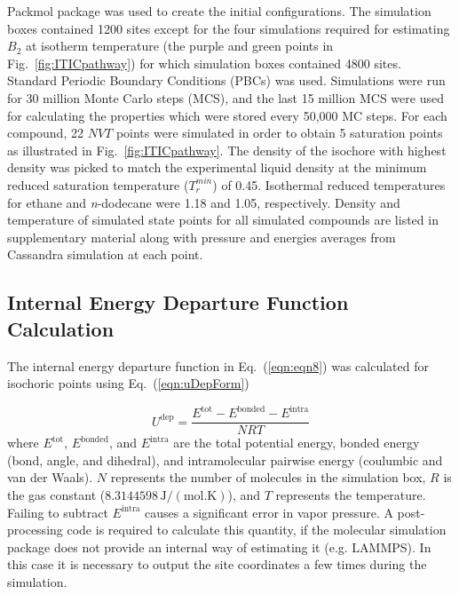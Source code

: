 \documentclass[5p,times]{elsarticle}
\begin{document}
Packmol \cite{martinez2009packmol} package was used to create the initial configurations. The simulation boxes contained 1200 sites except for the four simulations required for estimating $B_2$ at isotherm temperature (the purple and green points in Fig.~\ref{fig:ITICpathway}) for which simulation boxes contained 4800 sites. Standard Periodic Boundary Conditions (PBCs) was used. Simulations were run for 30 million Monte Carlo steps (MCS), and the last 15 million MCS were used for calculating the properties which were stored every 50,000 MC steps. For each compound, 22 $NVT$ points were simulated in order to obtain 5 saturation points as illustrated in Fig.~\ref{fig:ITICpathway}. The density of the isochore with highest density was picked to match the experimental liquid density at the minimum reduced saturation temperature ($T_r^{min}$) of 0.45. Isothermal reduced temperatures for ethane and \textit{n}-dodecane were 1.18 and 1.05, respectively. Density and temperature of simulated state points for all simulated compounds are listed in supplementary material along with pressure and energies averages from Cassandra simulation at each point.

\subsection{Internal Energy Departure Function Calculation}\label{sec:udepCalc}
The internal energy departure function in Eq.~(\ref{eqn:eqn8}) was calculated for isochoric points using Eq.~(\ref{eqn:uDepForm})

\begin{equation}
U^{\mathrm{dep}} = \frac{E^{\mathrm{tot}} - E^{\mathrm{bonded}} - E^{\mathrm{intra}}}{NRT}\label{eqn:uDepForm}
\end{equation}
where $E^{\mathrm{tot}}$, $E^{\mathrm{bonded}}$, and $E^{\mathrm{intra}}$ are the total potential energy, bonded energy (bond, angle, and dihedral), and intramolecular pairwise energy (coulumbic and van der Waals). $N$ represents the number of molecules in the simulation box, $R$ is the gas constant ($8.3144598\,\mathrm{J/(mol.K)}$), and $T$ represents the temperature. Failing to subtract $E^{\mathrm{intra}}$ causes a significant error in vapor pressure. A post-processing code is required to calculate this quantity, if the molecular simulation package does not provide an internal way of estimating it (e.g. LAMMPS). In this case it is necessary to output the site coordinates a few times during the simulation.
\end{document}
